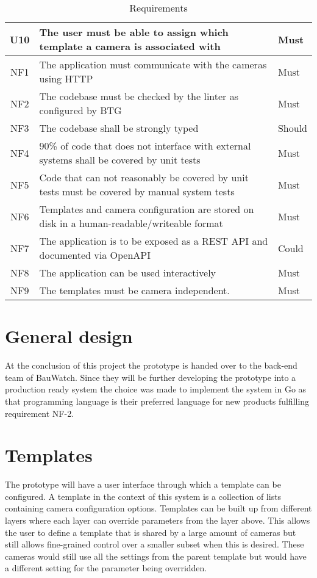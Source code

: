 \begin{table*}[h]
\begin{tabulary}{\linewidth}{CLL}
		\\ \hline
		U10 & The user must be able to assign which template a camera is associated with & Must
        \\ \hline
        NF1 & The application must communicate with the cameras using HTTP & Must
        \\ \hline
        NF2 & The codebase must be checked by the linter as configured by BTG & Must
        \\ \hline
        NF3 & The codebase shall be strongly typed & Should
        \\ \hline
        NF4 & 90\% of code that does not interface with external systems shall be covered by unit tests& Must
		\\ \hline
		NF5 & Code that can not reasonably be covered by unit tests must be covered by manual system tests & Must
        \\ \hline
        NF6 & Templates and camera configuration are stored on disk in a human-readable/writeable format & Must
        \\ \hline
        NF7 & The application is to be exposed as a REST API and documented via OpenAPI & Could
		\\ \hline
		NF8 & The application can be used interactively & Must
        \\ \hline
        NF9 & The templates must be camera independent. & Must
    \end{tabulary}
    \caption{Requirements}
    \label{tab:requirements}
\end{table*}

\section{General design}
At the conclusion of this project the prototype is handed over to the back-end team of BauWatch.
Since they will be further developing the prototype into a production ready system the choice was made to implement the system in Go as that programming language is their preferred language for new products fulfilling requirement NF-2.

\section{Templates}
The prototype will have a user interface through which a template can be configured.
A template in the context of this system is a collection of lists containing camera configuration options.
Templates can be built up from different layers where each layer can override parameters from the layer above.
This allows the user to define a template that is shared by a large amount of cameras but still allows fine-grained control over a smaller subset when this is desired.
These cameras would still use all the settings from the parent template but would have a different setting for the parameter being overridden.


